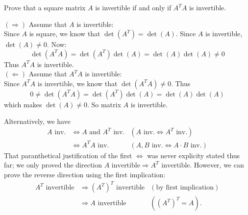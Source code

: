 \ii Prove that a square matrix $A$ is invertible if and only if $A^TA$ is invertible.
\\
\begin{solution}
\noindent
$(\Rightarrow)$ Assume that $A$ is invertible:\\
Since $A$ is square, we know that $\det(A^T) = \det(A)$. Since $A$ is invertible, $\det(A)\neq 0$. Now:
$$\det(A^TA)=\det(A^T)\det(A)=\det(A)\det(A)\neq 0 $$
Thus $A^TA$ is invertible.\\
$(\Leftarrow)$ Assume that $A^TA$ is invertible:\\
Since $A^TA$ is invertible, we know that $\det(A^TA) \neq 0$. Thus
$$ 0\neq \det(A^TA) = \det(A^T)\det(A) = \det(A)\det(A)$$
which makes $\det(A) \neq 0$. So matrix $A$ is invertible.

Alternatively, we have 
\begin{align*}
A \text{ inv.}&\Leftrightarrow A \text{ and } A^T \text{ inv.} &(A \text{ inv.}\Leftrightarrow A^T \text{ inv.})\\
&\Leftrightarrow A^TA \text{ inv.}&(A, B \text{ inv.}\Leftrightarrow A\cdot B \text{ inv.})
\end{align*}
That paranthetical justification of the first $\Leftrightarrow$ was never explicity stated thus far; we only proved the direction $A \text{ invertible}\Rightarrow A^T \text{ invertible}$. However, we can prove the reverse direction using the first implication:
\begin{align*}
A^T \text{ invertible}&\Rightarrow (A^T)^T \text{ invertible} &(\text{by first implication})\\
&\Rightarrow A \text{ invertible}&((A^T)^T=A).
\end{align*}
\end{solution}

